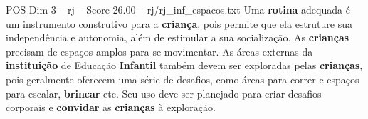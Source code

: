 \begin{textsample}{POS Dim 3 – rj – Score 26.00 – rj/rj\_inf\_espacos.txt}
Uma \textbf{rotina} adequada é um instrumento construtivo para a \textbf{criança}, pois permite que ela estruture sua independência e autonomia, além de estimular a sua socialização.
As \textbf{crianças} precisam de espaços amplos para se movimentar.
As áreas externas da \textbf{instituição} de Educação \textbf{Infantil} também devem ser exploradas pelas \textbf{crianças}, pois geralmente oferecem uma série de desafios, como áreas para correr e espaços para escalar, \textbf{brincar} etc.
Seu uso deve ser planejado para criar desafios corporais e \textbf{convidar} as \textbf{crianças} à exploração.

\end{textsample}
